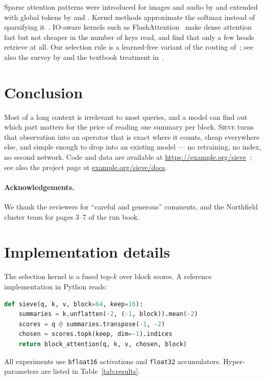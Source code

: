 \documentclass[11pt]{article}
\theoremstyle{definition}
\begin{document}
Sparse attention patterns were introduced for images and audio by
\citet{child2019generating} and extended with global tokens by
\citet{beltagy2020longformer} and \citet{zaheer2020bigbird}. Kernel methods
approximate the softmax instead of sparsifying it~\citep{choromanski2021rethinking}.
IO-aware kernels such as FlashAttention~\citep{dao2022flashattention} make dense
attention fast but not cheaper in the number of keys read, and
\citet{muller2024sparse} find that only a few heads retrieve at all. Our selection rule
is a learned-free variant of the routing of~\citet{roy2021efficient}; see also
the survey by \citet{tay2022efficient} and the textbook treatment
in~\cite{goodfellow2016deep}.

\section{Conclusion}

Most of a long context is irrelevant to most queries, and a model can find
out which part matters for the price of reading one summary per block.
\textsc{Sieve} turns that observation into an operator that is exact where it
counts, cheap everywhere else, and simple enough to drop into an existing
model --- no retraining, no index, no second network. Code and data are
available at \url{https://example.org/sieve}~\citep{sieve2026code}; see also the project page at
\href{https://example.org/sieve/docs}{example.org/sieve/docs}.

\paragraph{Acknowledgements.} We thank the reviewers for ``careful and
generous'' comments, and the Northfield cluster team for pages 3--7 of
the run book.

\appendix

\section{Implementation details}
\label{app:impl}

The selection kernel is a fused top-$k$ over block scores. A reference
implementation in Python reads:

\begin{lstlisting}[language=Python]
def sieve(q, k, v, block=64, keep=16):
    summaries = k.unflatten(-2, (-1, block)).mean(-2)
    scores = q @ summaries.transpose(-1, -2)
    chosen = scores.topk(keep, dim=-1).indices
    return block_attention(q, k, v, chosen, block)
\end{lstlisting}

All experiments use \texttt{bfloat16} activations and \texttt{float32}
accumulators. Hyper-parameters are listed in Table~\ref{tab:results}.



\end{document}
